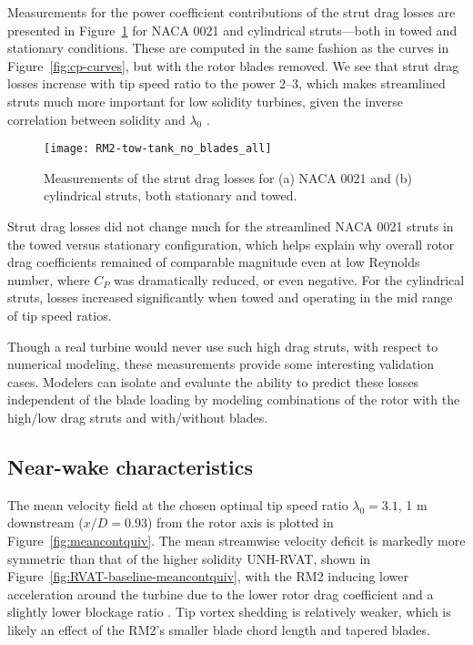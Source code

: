 Measurements for the power coefficient contributions of the strut drag losses
are presented in Figure~\ref{fig:no-blades} for NACA 0021 and cylindrical
struts---both in towed and stationary conditions. These are computed in the same
fashion as the curves in Figure~\ref{fig:cp-curves}, but with the rotor blades
removed. We see that strut drag losses increase with tip speed ratio to the
power 2--3, which makes streamlined struts much more important for low solidity
turbines, given the inverse correlation between solidity and $\lambda_0$
\cite{Templin1974}.

\begin{figure}
    \centering

    \texttt{[image: RM2-tow-tank\_no\_blades\_all]}
    
    \caption{Measurements of the strut drag losses for (a) NACA 0021 and (b)
        cylindrical struts, both stationary and towed.}
    
    \label{fig:no-blades}
\end{figure}

Strut drag losses did not change much for the streamlined NACA 0021 struts in
the towed versus stationary configuration, which helps explain why overall rotor
drag coefficients remained of comparable magnitude even at low Reynolds number,
where $C_P$ was dramatically reduced, or even negative. For the cylindrical
struts, losses increased significantly when towed and operating in the mid range
of tip speed ratios.

Though a real turbine would never use such high drag struts, with respect to
numerical modeling, these measurements provide some interesting validation
cases. Modelers can isolate and evaluate the ability to predict these losses
independent of the blade loading by modeling combinations of the rotor with the
high/low drag struts and with/without blades.


\subsection{Near-wake characteristics}

The mean velocity field at the chosen optimal tip speed ratio $\lambda_0=3.1$, 1
m downstream ($x/D=0.93$) from the rotor axis is plotted in
Figure~\ref{fig:meancontquiv}. The mean streamwise velocity deficit is markedly
more symmetric than that of the higher solidity UNH-RVAT, shown in
Figure~\ref{fig:RVAT-baseline-meancontquiv}, with the RM2 inducing lower
acceleration around the turbine due to the lower rotor drag coefficient and a
slightly lower blockage ratio \cite{Bachant2015-JoT}. Tip vortex shedding is
relatively weaker, which is likely an effect of the RM2's smaller blade chord
length and tapered blades.

